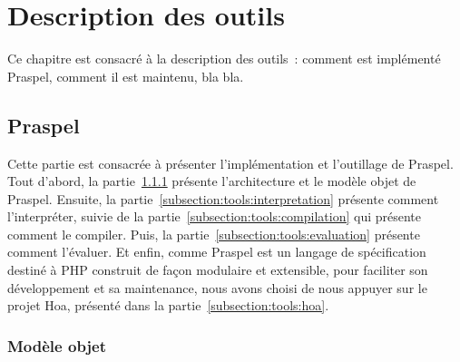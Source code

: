 \chapter{Description des outils}
\label{chapter:tools}

\minitoc

Ce chapitre est consacré à la description des outils~: comment est implémenté
Praspel, comment il est maintenu, bla bla.

\section{Praspel}
\label{section:tools:praspel}

Cette partie est consacrée à présenter l'implémentation et l'outillage de
Praspel. Tout d'abord, la partie~\ref{subsection:tools:model} présente
l'architecture et le modèle objet de Praspel. Ensuite, la
partie~\ref{subsection:tools:interpretation} présente comment l'interpréter,
suivie de la partie~\ref{subsection:tools:compilation} qui présente comment le
compiler. Puis, la partie~\ref{subsection:tools:evaluation} présente comment
l'évaluer. Et enfin, comme Praspel est un langage de spécification destiné à PHP
construit de façon modulaire et extensible, pour faciliter son développement et
sa maintenance, nous avons choisi de nous appuyer sur le projet Hoa, présenté
dans la partie~\ref{subsection:tools:hoa}.

\subsection{Modèle objet}
\label{subsection:tools:model}

